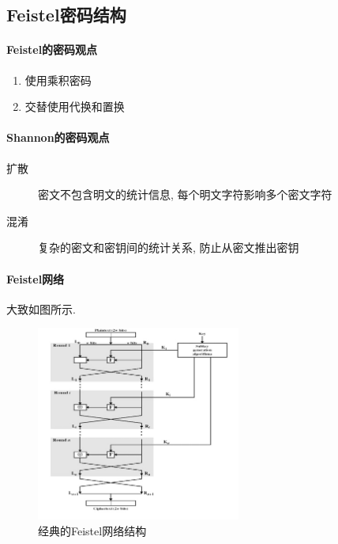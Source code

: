 \documentclass{ctexart}
\begin{document}

\subsection{Feistel密码结构}
\paragraph{Feistel的密码观点}
    \begin{enumerate}
        \item 使用乘积密码
        \item 交替使用代换和置换
    \end{enumerate}
\paragraph{Shannon的密码观点}
    \begin{description}
        \item[扩散] 密文不包含明文的统计信息, 每个明文字符影响多个密文字符
        \item[混淆] 复杂的密文和密钥间的统计关系, 防止从密文推出密钥
    \end{description}
\paragraph{Feistel网络}
    大致如图所示.
    \begin{figure}[ht]
    \vskip 0.2in
    \begin{center}
    \centerline{\includegraphics[width=0.6\textwidth]{feistel-net}}
    \caption{经典的Feistel网络结构}
    \label{lenet-structure}
    \end{center}
    \vskip -0.2in
    \end{figure} 
\end{document}

